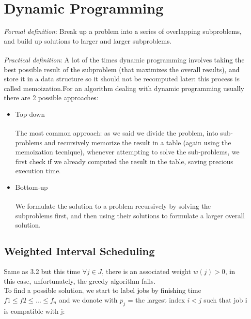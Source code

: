\section{Dynamic Programming}

\emph{Formal definition}: Break up a problem into a series of overlapping subproblems, and build up solutions to larger and larger subproblems.\\\\\emph{Practical definition}: A lot of the times dynamic programming involves taking the best possible result of the subproblem (that maximizes the overall results), and store it in a data structure so it should not be recomputed later: this process is called memoization.For an algorithm dealing with dynamic programming usually there are 2 possible approaches:\\

\begin{itemize}

    \item {Top-down}\\\\
          The most common approach: as we said we divide the problem, into sub-problems and recursively memorize the result in a table (again using the memoization tecnique), whenever attempting to solve the sub-problems, we first check if we already computed the result in the table, saving precious execution time.

    \item {Bottom-up}\\\\
          We formulate the solution to a problem recursively by solving the subproblems first, and then using their solutions to formulate a larger overall solution.

\end{itemize}

\subsection{Weighted Interval Scheduling}

Same as 3.2 but this time $\forall j \in J$, there is an associated weight $w(j) > 0$, in this case, unfortunately, the greedy algorithm fails.\\
To find a possible solution, we start to label jobs by finishing time $f1 \leq f2 \leq . . . \leq f_{n}$ and we donote with $p_{j}$ = the largest index $i < j$ such that job i is compatible with j:

